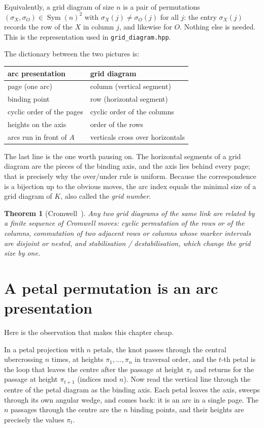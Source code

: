 \documentclass[11pt,oneside]{report}
\newtheorem{theorem}{Theorem}[chapter]
\theoremstyle{definition}
\DeclareMathOperator{\Sym}{Sym}
\begin{document}
Equivalently, a grid diagram of size $n$ is a pair of permutations
$(\sigma_X, \sigma_O) \in \Sym(n)^2$ with $\sigma_X(j) \neq \sigma_O(j)$ for
all $j$: the entry $\sigma_X(j)$ records the row of the $X$ in column $j$,
and likewise for $O$. Nothing else is needed. This is the representation
used in \texttt{grid\_diagram.hpp}.

The dictionary between the two pictures is:
\begin{center}
\begin{tabular}{@{}ll@{}}
\hline
arc presentation & grid diagram \\
\hline
page (one arc)            & column (vertical segment) \\
binding point             & row (horizontal segment) \\
cyclic order of the pages & cyclic order of the columns \\
heights on the axis       & order of the rows \\
arcs run in front of $A$  & verticals cross over horizontals \\
\hline
\end{tabular}
\end{center}
The last line is the one worth pausing on. The horizontal segments of a grid
diagram are the pieces of the binding axis, and the axis lies behind every
page; that is precisely why the over/under rule is uniform. Because the
correspondence is a bijection up to the obvious moves, the arc index equals
the minimal size of a grid diagram of $K$, also called the \emph{grid
number}.

\begin{theorem}[Cromwell~\cite{Cromwell}]
Any two grid diagrams of the same link are related by a finite sequence of
\emph{Cromwell moves}: cyclic permutation of the rows or of the columns,
commutation of two adjacent rows or columns whose marker intervals are
disjoint or nested, and stabilisation / destabilisation, which change the
grid size by one.
\end{theorem}

\section{A petal permutation is an arc presentation}\label{sec:petal-to-grid}

Here is the observation that makes this chapter cheap.

In a petal projection with $n$ petals, the knot passes through the central
ubercrossing $n$ times, at heights $\pi_1, \dots, \pi_n$ in traversal order,
and the $t$-th petal is the loop that leaves the centre after the passage at
height $\pi_t$ and returns for the passage at height $\pi_{t+1}$
(indices mod $n$). Now read the vertical line through the centre of the
petal diagram as the binding axis. Each petal leaves the axis, sweeps
through its own angular wedge, and comes back: it is an arc in a single
page. The $n$ passages through the centre are the $n$ binding points, and
their heights are precisely the values $\pi_t$.
\end{document}
